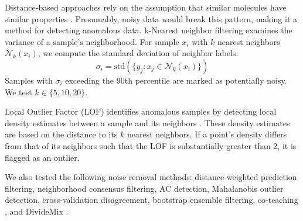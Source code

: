 Distance-based approaches rely on the assumption that similar molecules have similar properties \citep{Cherkasov2014}. Presumably, noisy data would break this pattern, making it a method for detecting anomalous data. k-Nearest neighbor filtering examines the variance of a sample's neighborhood. For sample $x_i$ with $k$ nearest neighbors $\mathcal{N}_k(x_i)$, we compute the standard deviation of neighbor labels:
$$
\sigma_i = \text{std}(\{y_j : x_j \in \mathcal{N}_k(x_i)\})
$$
Samples with $\sigma_i$ exceeding the 90th percentile are marked as potentially noisy. We test $k \in \{5, 10, 20\}$.

Local Outlier Factor (LOF) identifies anomalous samples by detecting local density estimates between a sample and its neighbors \citep{Breunig2000}. These density estimates are based on the distance to its $k$ nearest neighbors. If a point's density differs from that of its neighbors such that the LOF is substantially greater than 2, it is flagged as an outlier.

We also tested the following noise removal methods:  distance-weighted prediction filtering, neighborhood consensus filtering, AC detection, Mahalanobis outlier detection, cross-validation disagreement, bootstrap ensemble filtering, co-teaching \citep{Han2018}, and DivideMix \citep{li2020}.

